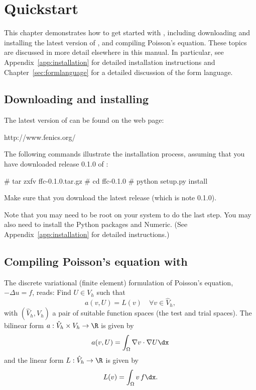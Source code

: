 \chapter{Quickstart}

This chapter demonstrates how to get started with \ffc{}, including
downloading and installing the latest version of \ffc{}, and compiling
Poisson's equation. These topics are discussed in more detail
elsewhere in this manual. In particular, see
Appendix~\ref{app:installation} for detailed installation instructions
and Chapter~\ref{sec:formlanguage} for a detailed discussion of the
form language.

\section{Downloading and installing \ffc{}}

The latest version of \ffc{} can be found on the \fenics{} web page:
\begin{code}
 http://www.fenics.org/
\end{code}
The following commands illustrate the installation process, assuming
that you have downloaded release 0.1.0 of \ffc{}:
\begin{code}
 # tar zxfv ffc-0.1.0.tar.gz
 # cd ffc-0.1.0
 # python setup.py install
\end{code}
Make sure that you download the latest release (which is note 0.1.0).

Note that you may need to be root on your system to do the last
step. You may also need to install the Python packages \fiat{} and
Numeric. (See Appendix~\ref{app:installation} for detailed instructions.)

\section{Compiling Poisson's equation with \ffc{}}

The discrete variational (finite element) formulation of Poisson's
equation, $-\Delta u = f$, reads: Find $U \in V_h$ such that
\begin{equation} \label{eq:varform}
  a(v, U) = L(v) \quad \forall v\in \hat{V}_h, 
\end{equation}
with $(\hat{V}_h, V_h)$ a pair of suitable function spaces (the test and
trial spaces). The bilinear form $a : \hat{V}_h \times V_h \rightarrow
\R$ is given by
\begin{equation}
  a(v, U) = \int_{\Omega} \nabla v \cdot \nabla U \dx
\end{equation}
and the linear form $L : \hat{V}_h \rightarrow \R$ is given by
\begin{equation}
  L(v) = \int_{\Omega} v \, f \dx.
\end{equation}

